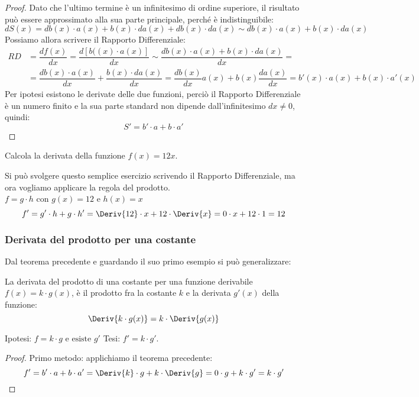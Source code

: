\begin{proof}
Dato che l'ultimo termine è un infinitesimo di ordine
superiore, il risultato può essere approssimato alla sua parte principale, 
perché è indistinguibile:
\[dS(x) = db(x)\cdot a(x) + b(x)\cdot da(x) + db(x)\cdot da(x)
                 \sim db(x)\cdot a(x)+b(x)\cdot da(x)\]
Possiamo allora scrivere il Rapporto Differenziale:
\begin{align*}
RD& = \dfrac{df(x)}{dx}=\dfrac{d[b((x)\cdot a(x)]}{dx} \sim 
      \dfrac{db(x)\cdot a(x)+b(x)\cdot da(x)}{dx}=\\
&=\dfrac{db(x)\cdot a(x)}{dx}+\dfrac{b(x)\cdot da(x)}{dx}=
\dfrac{db(x)}{dx} a(x)+b(x)\dfrac{da(x)}{dx} =
b'(x) \cdot a(x) + b(x) \cdot a'(x)
\end{align*}
Per ipotesi esistono le derivate delle due funzioni, perciò 
il Rapporto Differenziale è un numero finito e la sua parte standard non 
dipende dall'infinitesimo \(dx \neq 0\), quindi:
\[S' = b' \cdot a + b \cdot a'\]
\end{proof}

\begin{esempio}
\label{esem:diff_prodottocostante}
Calcola la derivata della funzione \(f(x)=12x\).

Si può svolgere questo semplice esercizio scrivendo il Rapporto 
Differenziale, ma ora vogliamo applicare la regola del prodotto.\\
\(f = g \cdot h\) \quad con \(g(x) = 12\) e \(h(x) = x\)
\[f' = g' \cdot h + g \cdot h' = 
\Deriv{12} \cdot x + 12 \cdot \Deriv{x} =
0 \cdot x + 12\cdot 1 = 12\]
\end{esempio}
% 
% 

\subsubsection{Derivata del prodotto per una costante}
\label{subsubsec:derivata_f_per_k}

Dal teorema precedente e guardando il suo primo esempio si può 
generalizzare:
\begin{teorema}
La derivata del prodotto di una costante per una funzione derivabile
\(f(x) = k \cdot g(x)\), è il prodotto fra la 
costante \(k\) e la derivata \(g'(x)\) della funzione: 
\[\Deriv{k \cdot g(x)} =k \cdot \Deriv{g(x)}\]
\end{teorema}
\noindent Ipotesi: \(f = k \cdot g \text{ e esiste } g'\)
\tab Tesi: \(f' = k \cdot g'\). 
\begin{proof}
Primo metodo: applichiamo il teorema precedente:
\[f' = b' \cdot a + b \cdot a' = 
\Deriv{k} \cdot g + k \cdot \Deriv{g} =
0 \cdot g + k\cdot g' = k \cdot g'\]
\end{proof}

